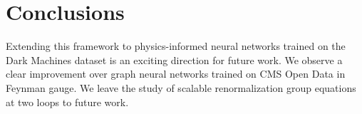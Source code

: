 \section{Conclusions}\label{sec:conclusions}

Extending this framework to physics-informed neural networks trained on
the Dark Machines dataset is an exciting direction for future work. We
observe a clear improvement over graph neural networks trained on CMS
Open Data in Feynman gauge. We leave the study of scalable
renormalization group equations at two loops to future work.

